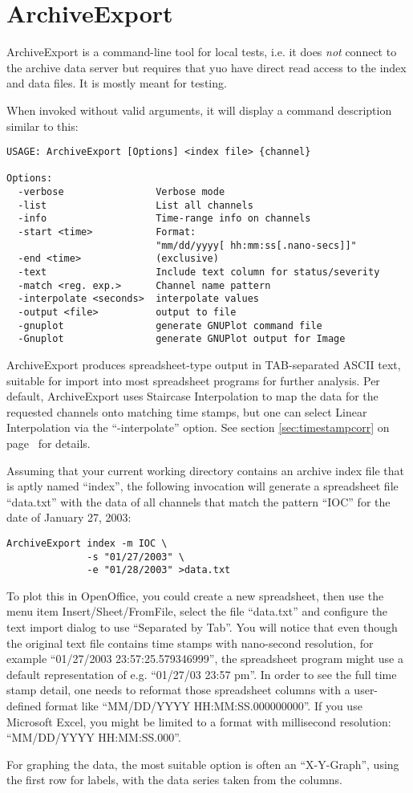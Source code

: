 \chapter{ArchiveExport}
ArchiveExport is a command-line tool for local tests, i.e. it does
\emph{not} connect to the archive data server but requires that
yuo have direct read access to the index and data files.
It is mostly meant for testing.

When invoked without valid arguments, it will display a command
description similar to this:

\begin{lstlisting}[frame=none,keywordstyle=\sffamily]
USAGE: ArchiveExport [Options] <index file> {channel}
 
Options:
  -verbose                Verbose mode
  -list                   List all channels
  -info                   Time-range info on channels
  -start <time>           Format:
                          "mm/dd/yyyy[ hh:mm:ss[.nano-secs]]"
  -end <time>             (exclusive)
  -text                   Include text column for status/severity
  -match <reg. exp.>      Channel name pattern
  -interpolate <seconds>  interpolate values
  -output <file>          output to file
  -gnuplot                generate GNUPlot command file
  -Gnuplot                generate GNUPlot output for Image
\end{lstlisting}

\noindent ArchiveExport produces spreadsheet-type output in
TAB-separated ASCII text, suitable for import into most spreadsheet
programs for further analysis. Per default, ArchiveExport uses
Staircase Interpolation to map the data for the requested channels
onto matching time stamps, but one can select Linear Interpolation via
the ``-interpolate'' option. See section \ref{sec:timestampcorr} on
page~\pageref{sec:timestampcorr} for details.

Assuming that your current working directory contains an
archive index file that is aptly named ``index'', the following
invocation will generate a spreadsheet file ``data.txt'' with the data
of all channels that match the pattern ``IOC'' for the date of January
27, 2003:

\begin{lstlisting}[frame=none,keywordstyle=\sffamily]
ArchiveExport index -m IOC \
              -s "01/27/2003" \
              -e "01/28/2003" >data.txt
\end{lstlisting}

\noindent To plot this in OpenOffice, you could create a new
spreadsheet, then use the menu item Insert/Sheet/FromFile, select the
file ``data.txt'' and configure the text import dialog to use
``Separated by Tab''. You will notice that even though the original
text file contains time stamps with nano-second resolution, for
example ``01/27/2003 23:57:25.579346999'', the spreadsheet program
might use a default representation of e.g. 
``01/27/03 23:57 pm''.
In order to see the full time stamp detail, one needs to reformat
those spreadsheet columns with a user-defined format like
``MM/DD/YYYY HH:MM:SS.000000000''.
If you use Microsoft Excel, you might be limited to a format with
millisecond resolution: ``MM/DD/YYYY HH:MM:SS.000''.

For graphing the data, the most suitable option is often an
``X-Y-Graph'', using the first row for labels, with the data series
taken from the columns.
